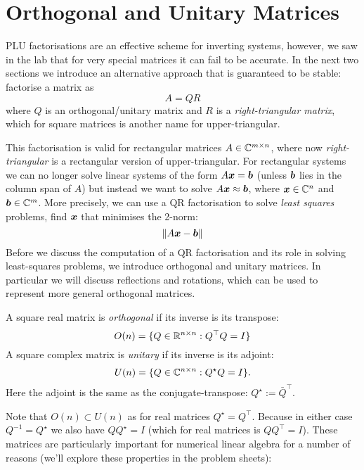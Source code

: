 
\section{Orthogonal and Unitary Matrices}
PLU factorisations are an effective scheme for inverting systems, however, we saw in the lab that for very special matrices it can fail to be accurate. In the next two sections we introduce an alternative approach that is guaranteed to be stable: factorise a matrix as
\[
A = QR
\]
where $Q$ is an orthogonal/unitary matrix and $R$ is a \emph{right-triangular matrix}, which for square matrices is another name for upper-triangular.

This factorisation is valid for rectangular matrices $A \in {\mathbb C}^{m \times n}$, where now \emph{right-triangular} is a rectangular version of upper-triangular. For rectangular systems we can no longer solve linear systems of the form $A\bm{{\mbox{\boldmath$x$\unboldmath}}} = \bm{{\mbox{\boldmath$b$\unboldmath}}}$ (unless $\bm{{\mbox{\boldmath$b$\unboldmath}}}$ lies in the column span of $A$) but instead we want to solve $A\bm{{\mbox{\boldmath$x$\unboldmath}}} \approx \bm{{\mbox{\boldmath$b$\unboldmath}}}$, where $\bm{{\mbox{\boldmath$x$\unboldmath}}} \in {\mathbb C}^n$ and $\bm{{\mbox{\boldmath$b$\unboldmath}}} \in {\mathbb C}^m$. More precisely, we can use a QR factorisation to solve \emph{least squares} problems, find $\bm{{\mbox{\boldmath$x$\unboldmath}}}$ that minimises the 2-norm:
\[
\|A \bm{{\mbox{\boldmath$x$\unboldmath}}} - \bm{{\mbox{\boldmath$b$\unboldmath}}} \|
\]
Before we discuss the computation of a QR factorisation and its role in solving least-squares problems, we introduce orthogonal and unitary matrices. In particular we will discuss reflections and rotations, which can be used to represent more general orthogonal matrices.

\begin{definition} A square real matrix is \emph{orthogonal} if its inverse is its transpose:
\[
O(n) = \{Q \in {\mathbb R}^{n \times n} : Q^\top Q = I \}
\]
A square complex matrix is \emph{unitary} if its inverse is its adjoint:
\[
U(n) = \{Q \in {\mathbb C}^{n \times n} : Q^\star Q = I \}.
\]
Here the adjoint is the same as the conjugate-transpose: $Q^\ensuremath{\star} := \bar Q^\ensuremath{\top}$.  \end{definition}

Note that $O(n) \ensuremath{\subset} U(n)$ as for real matrices $Q^\ensuremath{\star} = Q^\ensuremath{\top}$. Because in either case $Q^{-1} = Q^\ensuremath{\star}$ we also have $Q Q^\ensuremath{\star} = I$ (which for real matrices is $Q Q^\ensuremath{\top} = I$). These matrices are particularly important for numerical linear algebra for a number of reasons (we'll explore these properties in the problem sheets):

